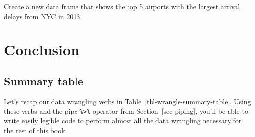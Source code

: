 \documentclass[
  letterpaper,
  DIV=11,
  numbers=noendperiod]{scrreprt}
\theoremstyle{definition}
\theoremstyle{remark}
\begin{document}
\begin{tcolorbox}[enhanced jigsaw, coltitle=black, toprule=.15mm, bottomtitle=1mm, breakable, leftrule=.75mm, title={{🎯} Learning Check 3.20}, opacitybacktitle=0.6, colback=white, rightrule=.15mm, opacityback=0, toptitle=1mm, colbacktitle=quarto-callout-tip-color!10!white, colframe=quarto-callout-tip-color-frame, titlerule=0mm, arc=.35mm, bottomrule=.15mm, left=2mm]
Create a new data frame that shows the top 5 airports with the largest
arrival delays from NYC in 2013.
\end{tcolorbox}

\hypertarget{sec-wrangling-conclusion}{%
\section{Conclusion}\label{sec-wrangling-conclusion}}

\hypertarget{summary-table-1}{%
\subsection{Summary table}\label{summary-table-1}}

Let's recap our data wrangling verbs in
Table~\ref{tbl-wrangle-summary-table}. Using these verbs and the pipe
\texttt{\%\textgreater{}\%} operator from Section~\ref{sec-piping},
you'll be able to write easily legible code to perform almost all the
data wrangling necessary for the rest of this book.
\end{document}
